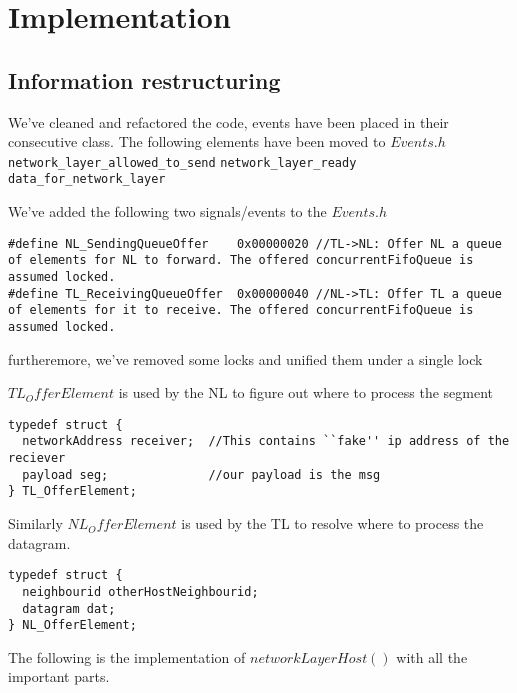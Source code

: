 \section{Implementation}
\subsection{Information restructuring}

We've cleaned and refactored the code, events have been placed in their consecutive class.
The following elements have been moved to $Events.h$
\\
\texttt{network\_layer\_allowed\_to\_send}
\break
\texttt{network\_layer\_ready}
\break
\texttt{data\_for\_network\_layer}
\break

We've added the following two signals/events to the $Events.h$

\begin{lstlisting}
#define NL_SendingQueueOffer    0x00000020 //TL->NL: Offer NL a queue of elements for NL to forward. The offered concurrentFifoQueue is assumed locked.
#define TL_ReceivingQueueOffer  0x00000040 //NL->TL: Offer TL a queue of elements for it to receive. The offered concurrentFifoQueue is assumed locked.
\end{lstlisting}

furtheremore, we've removed some locks and unified them under a single lock



$TL_OfferElement$ is used by the NL to figure out where to process the segment

\begin{lstlisting}
typedef struct {
  networkAddress receiver;  //This contains ``fake'' ip address of the reciever
  payload seg;              //our payload is the msg
} TL_OfferElement;
\end{lstlisting}

Similarly $NL_OfferElement$ is used by the TL to resolve where to process the datagram.
\begin{lstlisting}
typedef struct {
  neighbourid otherHostNeighbourid;
  datagram dat;
} NL_OfferElement;
\end{lstlisting}

The following is the implementation of $networkLayerHost()$ with all the important parts.

